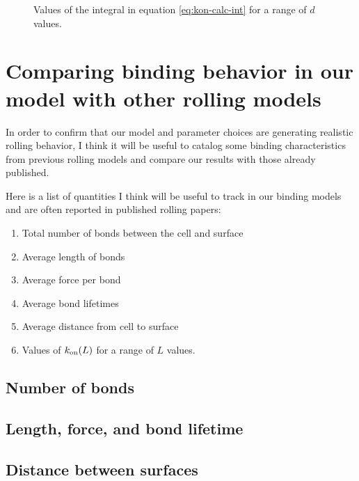 \documentclass{article}
\newcommand{\tn}{\textnormal}
\begin{document}
\begin{figure}
  \centering
  \caption{Values of the integral in equation \eqref{eq:kon-calc-int}
    for a range of $d$ values.}
  \label{fig:int-vals}
\end{figure}

\section{Comparing binding behavior in our model with other rolling models}
\label{sec:comparing-binding}

In order to confirm that our model and parameter choices are
generating realistic rolling behavior, I think it will be useful to
catalog some binding characteristics from previous rolling models and
compare our results with those already published.

Here is a list of quantities I think will be useful to track in our
binding models and are often reported in published rolling papers:
\begin{enumerate}
\item Total number of bonds between the cell and surface
\item Average length of bonds
\item Average force per bond
\item Average bond lifetimes
\item Average distance from cell to surface
\item Values of $k_\tn{on}(L)$ for a range of $L$ values.
\end{enumerate}

\subsection{Number of bonds}
\label{sec:number-bonds}

\subsection{Length, force, and bond lifetime}
\label{sec:length-force-lifetime}

\subsection{Distance between surfaces}
\label{sec:sep-distance}
\end{document}

